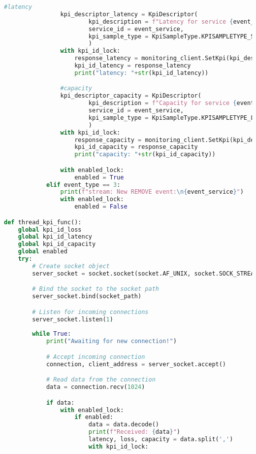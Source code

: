 \begin{lstlisting}[language=Python]
                #latency
                kpi_descriptor_latency = KpiDescriptor(
                        kpi_description = f"Latency for service {event_service_uuid}",
                        service_id = event_service,
                        kpi_sample_type = KpiSampleType.KPISAMPLETYPE_SERVICE_LATENCY_MS
                        )
                with kpi_id_lock:
                    response_latency = monitoring_client.SetKpi(kpi_descriptor_latency)
                    kpi_id_latency = response_latency
                    print("latency: "+str(kpi_id_latency))

                #capacity
                kpi_descriptor_capacity = KpiDescriptor(
                        kpi_description = f"Capacity for service {event_service_uuid}",
                        service_id = event_service,
                        kpi_sample_type = KpiSampleType.KPISAMPLETYPE_LINK_TOTAL_CAPACITY_GBPS
                        )
                with kpi_id_lock:
                    response_capacity = monitoring_client.SetKpi(kpi_descriptor_capacity)
                    kpi_id_capacity = response_capacity
                    print("capacity: "+str(kpi_id_capacity))

                with enabled_lock:
                    enabled = True
            elif event_type == 3:
                print(f"stream: New REMOVE event:\n{event_service}")
                with enabled_lock:
                    enabled = False

def thread_kpi_func():
    global kpi_id_loss
    global kpi_id_latency
    global kpi_id_capacity
    global enabled
    try:
        # Create socket object
        server_socket = socket.socket(socket.AF_UNIX, socket.SOCK_STREAM)

        # Bind the socket to the socket path
        server_socket.bind(socket_path)

        # Listen for incoming connections
        server_socket.listen(1)
        
        while True:
            print("Awaiting for new connection!")

            # Accept incoming connection
            connection, client_address = server_socket.accept()

            # Read data from the connection
            data = connection.recv(1024)

            if data:
                with enabled_lock:
                    if enabled: 
                        data = data.decode()
                        print(f"Received: {data}")
                        latency, loss, capacity = data.split(',')
                        with kpi_id_lock:
                            

\end{lstlisting}
